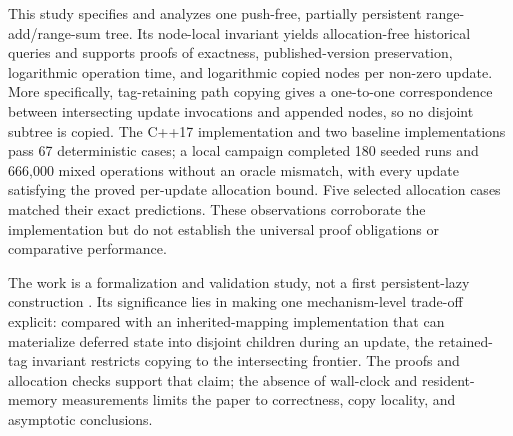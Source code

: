 \documentclass[conference]{IEEEtran}
\begin{document}
This study specifies and analyzes one push-free, partially persistent
range-add/range-sum tree. Its node-local invariant yields allocation-free historical queries and
supports proofs of exactness, published-version preservation, logarithmic operation time, and
logarithmic copied nodes per non-zero update. More specifically, tag-retaining path copying gives
a one-to-one correspondence between intersecting update invocations and appended nodes, so no
disjoint subtree is copied. The C++17 implementation and two baseline implementations pass 67 deterministic
cases; a local campaign completed 180 seeded runs and
666{,}000 mixed operations without an oracle mismatch, with every update satisfying the proved
per-update allocation bound. Five selected allocation cases matched their exact predictions.
These observations corroborate the implementation but do not establish
the universal proof obligations or comparative performance.

The work is a formalization and validation study, not a first persistent-lazy construction
\cite{proconlib2026persistent}. Its significance lies in making one mechanism-level trade-off
explicit: compared with an inherited-mapping implementation that can materialize deferred state
into disjoint children during an update, the retained-tag invariant restricts copying to the
intersecting frontier. The proofs and allocation checks support that claim; the absence of
wall-clock and resident-memory measurements limits the paper to correctness, copy locality, and
asymptotic conclusions.



\end{document}
